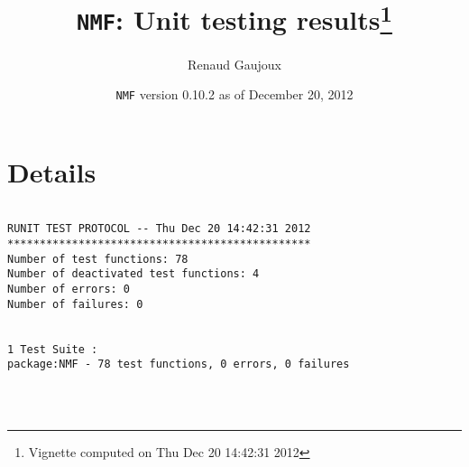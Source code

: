 \documentclass[10pt]{article}
\author{Renaud Gaujoux}
\title{\texttt{NMF}: Unit testing results\footnote{Vignette computed  on Thu Dec 20 14:42:31 2012}}
\date{\texttt{NMF} version 0.10.2 as of December 20, 2012}
\begin{document}
\maketitle

\section{Details}
\begin{verbatim}

RUNIT TEST PROTOCOL -- Thu Dec 20 14:42:31 2012 
*********************************************** 
Number of test functions: 78 
Number of deactivated test functions: 4 
Number of errors: 0 
Number of failures: 0 

 
1 Test Suite : 
package:NMF - 78 test functions, 0 errors, 0 failures




\end{verbatim}
\end{document}
